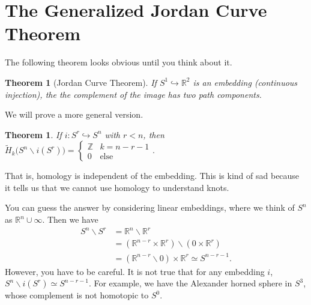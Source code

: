 \documentclass[12pt]{article}
\theoremstyle{plain}
\newtheorem{theorem}[equation]{Theorem}
\theoremstyle{definition}
\theoremstyle{remark}
\renewcommand{\H}{\widetilde H}
\newcommand{\RR}{\ensuremath{\mathbb{R}}}
\newcommand{\ZZ}{\ensuremath{\mathbb{Z}}}
\begin{document}
 \section{The Generalized Jordan Curve Theorem}
 The following theorem looks obvious until you think about it.
 \begin{theorem}[Jordan Curve Theorem]
   If $S^1\hookrightarrow \RR^2$ is an embedding (continuous injection), the the
   complement of the image has two path components.
 \end{theorem}
 We will prove a more general version.
 \begin{theorem} \label{T:GJCT}
   If $i:S^r\hookrightarrow S^n$ with $r<n$, then
   $\H_k\bigl(S^n\smallsetminus i(S^r)\bigr)=\begin{cases}
     \ZZ & k=n-r-1\\
     0 & \text{else}
   \end{cases}.$
 \end{theorem}
 That is, homology is independent of the embedding. This is kind of sad because it tells
 us that we cannot use homology to understand knots.

 You can guess the answer by considering linear embeddings, where we think of $S^n$ as
 $\RR^n\cup \infty$. Then we have
 \begin{align*}
   S^n\smallsetminus S^r &= \RR^n\smallsetminus \RR^r\\
    &= (\RR^{n-r} \times \RR^r) \smallsetminus (0\times \RR^r)\\
    &= (\RR^{n-r}\smallsetminus 0)\times \RR^r \simeq S^{n-r-1}.
 \end{align*}
 However, you have to be careful. It is not true that for any embedding $i$,
 $S^n\smallsetminus i(S^r)\simeq S^{n-r-1}$. For example, we have the Alexander horned
 sphere in $S^3$, whose complement is not homotopic to $S^0$.
\end{document}
